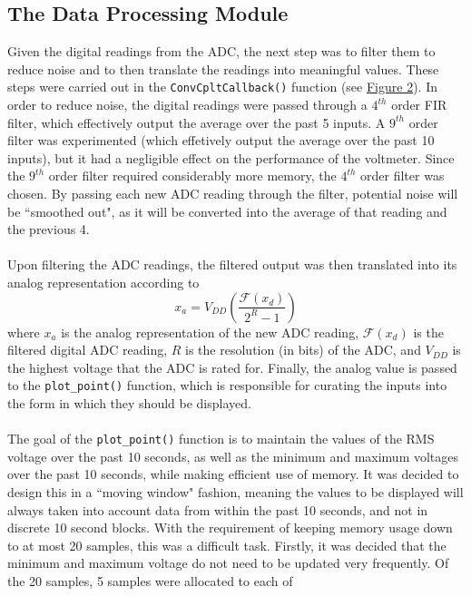 \documentclass[12pt]{report}
\begin{document}
\subsection{The Data Processing Module}\label{dataproc}
Given the digital readings from the ADC, the next step was to filter them to reduce noise and to
then translate the readings into meaningful values. These steps were carried out in the
\texttt{ConvCpltCallback()} function (see \hyperref[adcflow]{Figure 2}). In order to reduce noise,
the digital readings
were passed through a $4^{th}$ order FIR filter, which effectively output the average over the past
5 inputs. A $9^{th}$ order filter was experimented (which effetively output the average over the
past 10 inputs), but it had a negligible effect on the performance of the voltmeter. Since the
$9^{th}$ order filter required considerably more memory, the $4^{th}$ order filter was chosen. By
passing each new ADC reading through the filter, potential noise will be ``smoothed out", as it will
be converted into the average of that reading and the previous 4.\\\\
Upon filtering the ADC readings, the filtered output was then translated into its analog
representation according to
\begin{equation}
	x_a = V_{DD}\left (\frac{\mathcal{F}(x_d)}{2^{R} -1}\right)
\end{equation}
where $x_a$ is the analog representation of the new ADC reading, $\mathcal{F}(x_d)$ is the filtered
digital ADC reading, $R$ is the resolution (in bits) of the ADC, and $V_{DD}$ is the highest voltage
that the ADC is rated for. Finally, the analog value is passed to the \texttt{plot\_point()}
function, which is responsible for curating the inputs into the form in which they should be
displayed.\\\\
The goal of the \texttt{plot\_point()} function is to maintain the values of the RMS voltage over
the past 10 seconds, as well as the minimum and maximum voltages over the past 10 seconds, while
making efficient use of memory. It was decided to design this in a ``moving window" fashion, meaning
the values to be displayed will always taken into account data from within the past 10 seconds, and
not in discrete 10 second blocks. With the requirement of keeping memory usage down to at most 20
samples, this was a difficult task. Firstly, it was decided that the minimum and maximum voltage do
not need to be updated very frequently. Of the 20 samples, 5 samples were allocated to each of
\end{document}
